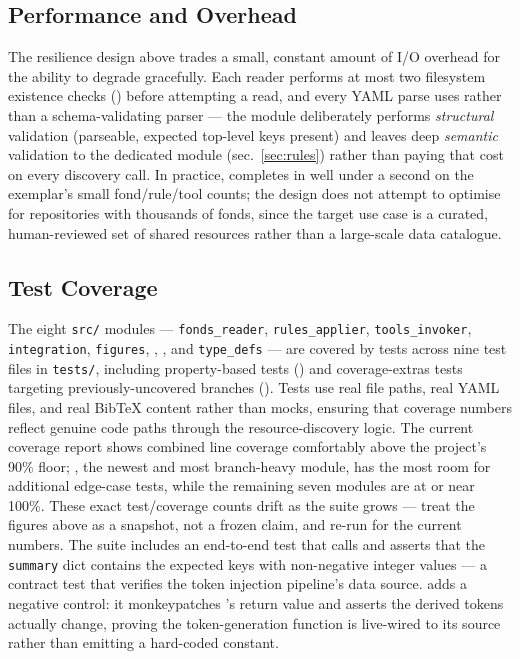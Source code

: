 \documentclass[
]{article}
\begin{document}
\subsection{Performance and Overhead}\label{performance-and-overhead}

The resilience design above trades a small, constant amount of I/O
overhead for the ability to degrade gracefully. Each reader performs at
most two filesystem existence checks ()
before attempting a read, and every YAML parse uses
 rather than a schema-validating parser ---
the module deliberately performs \emph{structural} validation
(parseable, expected top-level keys present) and leaves deep
\emph{semantic} validation to the dedicated
 module (sec.~\ref{sec:rules}) rather
than paying that cost on every discovery call. In practice,
 completes in well under a
second on the exemplar's small fond/rule/tool counts; the design does
not attempt to optimise for repositories with thousands of fonds, since
the target use case is a curated, human-reviewed set of shared resources
rather than a large-scale data catalogue.

\subsection{Test Coverage}\label{test-coverage}

The eight \texttt{src/} modules --- \texttt{fonds\_reader},
\texttt{rules\_applier}, \texttt{tools\_invoker}, \texttt{integration},
\texttt{figures}, ,
, and \texttt{type\_defs} --- are covered
by tests across nine test files in \texttt{tests/}, including
property-based tests () and
coverage-extras tests targeting previously-uncovered branches
(). Tests use real file paths, real
YAML files, and real BibTeX content rather than mocks, ensuring that
coverage numbers reflect genuine code paths through the
resource-discovery logic. The current coverage report shows combined
line coverage comfortably above the project's 90\% floor;
, the newest and most branch-heavy
module, has the most room for additional edge-case tests, while the
remaining seven modules are at or near 100\%. These exact test/coverage
counts drift as the suite grows --- treat the figures above as a
snapshot, not a frozen claim, and re-run
 for the current
numbers. The  suite includes an
end-to-end test that calls  and asserts
that the \texttt{summary} dict contains the expected keys with
non-negative integer values --- a contract test that verifies the token
injection pipeline's data source.
 adds a negative control:
it monkeypatches 's return value and
asserts the derived tokens actually change, proving the token-generation
function is live-wired to its source rather than emitting a hard-coded
constant.
\end{document}
